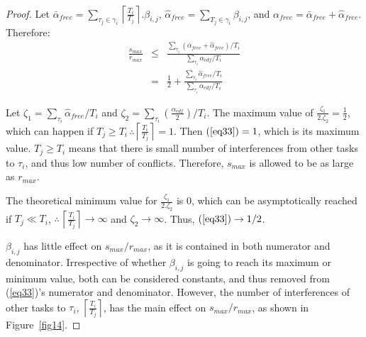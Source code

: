 \documentclass{sig-alternate}
\begin{document}
\begin{proof}
Let $\bar{\alpha}_{free}=\sum_{\tau_{j}\in\gamma_{i}}\left\lceil\frac{T_{i}}{T_{j}}\right\rceil.\beta_{i,j}$,  $\hat{\alpha}_{free}=\sum_{T_{j}\in\gamma_{i}}\beta_{i,j}$, and $\alpha_{free}=\bar{\alpha}_{free}+\hat{\alpha}_{free}.$ Therefore: 
\begin{eqnarray}
\frac{s_{max}}{r_{max}} & \le & \frac{\sum_{\tau_{i}}(\bar{\alpha}_{free} +\hat{\alpha}_{free})/T_{i}}{\sum_{\tau_{i}}\alpha_{edf}/T_{i}}\nonumber \\
 & = & \frac{1}{2}+\frac{\sum_{\tau_{i}}\hat{\alpha}_{free} /T_{i}}{\sum_{\tau_{i}}\alpha_{edf}/T_{i}}
 \label{eq33}
 \end{eqnarray}

Let $\zeta_{1}=\sum_{\tau_{i}}\hat{\alpha}_{free}/T_{i}$
and $\zeta_{2}=\sum_{\tau_{i}}\left(\frac{\alpha_{edf}}{2}\right)/T_{i}$. The maximum value of $\frac{\zeta_{1}}{2.\zeta_{2}}=\frac{1}{2}$, which can happen if $T_{j}\ge T_{i}\,\therefore\left\lceil\frac{T_{i}}{T_{j}}\right\rceil=1$. Then $(\ref{eq33})=1$, which is its maximum value. $T_{j}\ge T_{i}$ means that there is small number of interferences from other tasks
to $\tau_{i}$, and thus low number of conflicts. Therefore, $s_{max}$ is
allowed to be as large as $r_{max}$.

The theoretical minimum value for $\frac{\zeta_{1}}{2.\zeta_{2}}$
is $0$, which can be asymptotically reached if $T_{j}\ll T_{i}$,
$\therefore\,\left\lceil\frac{T_{i}}{T_{j}}\right\rceil\rightarrow\infty$
and $\zeta_{2}\rightarrow\infty$. Thus, $(\ref{eq33})\rightarrow1/2$.

$\beta_{i,j}$ has little effect on $s_{max}/r_{max}$, 
as it is contained in both numerator and denominator. Irrespective of whether $\beta_{i,j}$ is going to reach its maximum or minimum value, both can be considered constants, and thus removed from (\ref{eq33})'s numerator and denominator. 
However, the number of
interferences of other tasks to $\tau_{i}$, $\left\lceil\frac{T_{i}}{T_{j}}\right\rceil$,
has the main effect on $s_{max}/r_{max}$, 
as shown in Figure~\ref{fig14}. 
\end{proof}
\end{document}
